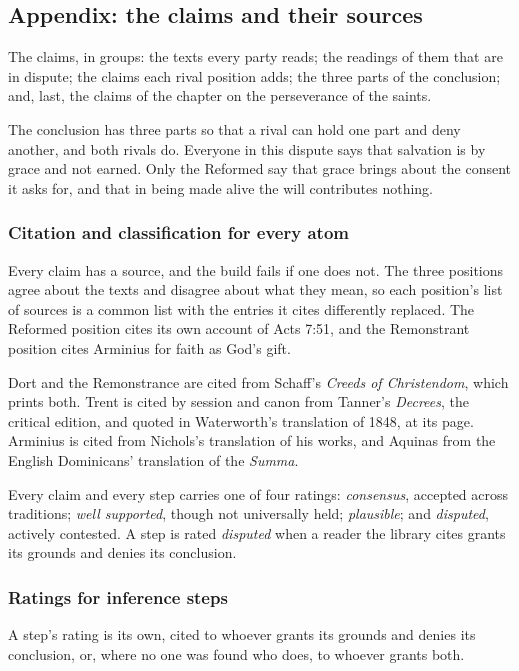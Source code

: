 \documentclass[11pt]{article}
\begin{document}
\subsection*{Appendix: the claims and their sources}
The claims, in groups: the texts every party reads; the readings of them that are in dispute; the claims each rival position adds; the three parts of the conclusion; and, last, the claims of the chapter on the perseverance of the saints.

The conclusion has three parts so that a rival can hold one part and deny another, and both rivals do. Everyone in this dispute says that salvation is by grace and not earned. Only the Reformed say that grace brings about the consent it asks for, and that in being made alive the will contributes nothing.

\subsubsection*{Citation and classification for every atom}
Every claim has a source, and the build fails if one does not. The three positions agree about the texts and disagree about what they mean, so each position’s list of sources is a common list with the entries it cites differently replaced. The Reformed position cites its own account of Acts 7:51, and the Remonstrant position cites Arminius for faith as God’s gift.

Dort and the Remonstrance are cited from Schaff’s \emph{Creeds of Christendom}, which prints both. Trent is cited by session and canon from Tanner’s \emph{Decrees}, the critical edition, and quoted in Waterworth’s translation of 1848, at its page. Arminius is cited from Nichols’s translation of his works, and Aquinas from the English Dominicans’ translation of the \emph{Summa}.

Every claim and every step carries one of four ratings: \emph{consensus}, accepted across traditions; \emph{well supported}, though not universally held; \emph{plausible}; and \emph{disputed}, actively contested. A step is rated \emph{disputed} when a reader the library cites grants its grounds and denies its conclusion.

\subsubsection*{Ratings for inference steps}
A step’s rating is its own, cited to whoever grants its grounds and denies its conclusion, or, where no one was found who does, to whoever grants both.
\end{document}

